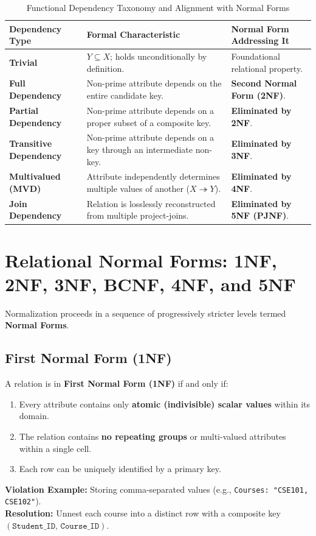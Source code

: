 \begin{table}[htbp]
\centering
\caption{Functional Dependency Taxonomy and Alignment with Normal Forms}
\label{tab:fd_taxonomy_comparison}
\begin{tabularx}{\textwidth}{p{2.8cm} X X}
\toprule
\textbf{Dependency Type} & \textbf{Formal Characteristic} & \textbf{Normal Form Addressing It} \\
\midrule
\textbf{Trivial} & $Y \subseteq X$; holds unconditionally by definition. & Foundational relational property. \\
\textbf{Full Dependency} & Non-prime attribute depends on the entire candidate key. & \textbf{Second Normal Form (2NF)}. \\
\textbf{Partial Dependency} & Non-prime attribute depends on a proper subset of a composite key. & \textbf{Eliminated by 2NF}. \\
\textbf{Transitive Dependency} & Non-prime attribute depends on a key through an intermediate non-key. & \textbf{Eliminated by 3NF}. \\
\textbf{Multivalued (MVD)} & Attribute independently determines multiple values of another ($X \twoheadrightarrow Y$). & \textbf{Eliminated by 4NF}. \\
\textbf{Join Dependency} & Relation is losslessly reconstructed from multiple project-joins. & \textbf{Eliminated by 5NF (PJNF)}. \\
\bottomrule
\end{tabularx}
\end{table}

\newpage
\section{Relational Normal Forms: 1NF, 2NF, 3NF, BCNF, 4NF, and 5NF}

Normalization proceeds in a sequence of progressively stricter levels termed \textbf{Normal Forms}.

\subsection{First Normal Form (1NF)}

\begin{tcolorbox}[colback=white,colframe=black,title=\textbf{1NF Definition}]
A relation is in \textbf{First Normal Form (1NF)} if and only if:
\begin{enumerate}
\item Every attribute contains only \textbf{atomic (indivisible) scalar values} within its domain.
\item The relation contains \textbf{no repeating groups} or multi-valued attributes within a single cell.
\item Each row can be uniquely identified by a primary key.
\end{enumerate}
\end{tcolorbox}
\textbf{Violation Example:} Storing comma-separated values (e.g., \texttt{Courses: "CSE101, CSE102"}).\\
\textbf{Resolution:} Unnest each course into a distinct row with a composite key $(\texttt{Student\_ID, Course\_ID})$.

